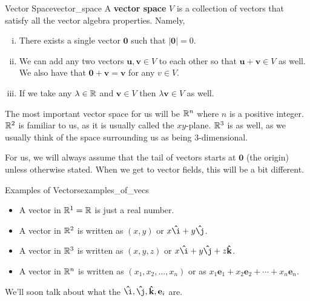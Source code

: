         \begin{df}{Vector Space}{vector_space}
        A \textbf{vector space}  $V$ is a collection of vectors that satisfy all the vector algebra properties. Namely,
        \begin{enumerate}[(i)]
            \item There exists a single vector $\mathbf{0}$ such that $|\mathbf{0}|=0.$
            \item We can add any two vectors $\mathbf{u},\mathbf{v}\in V$ to each other so that $\mathbf{u}+\mathbf{v}\in V$ as well. We also have that $\mathbf{0}+\mathbf{v}=\mathbf{v}$ for any $v\in V$.
            \item If we take any $\lambda \in \mathbb{R}$ and $\mathbf{v}\in V$ then $\lambda \mathbf{v} \in V$ as well.
        \end{enumerate}
        \end{df}
        
        The most important vector space for us will be $\mathbb{R}^n$ where $n$ is a positive integer.  $\mathbb{R}^2$ is familiar to us, as it is usually called the $xy$-plane. $\mathbb{R}^3$ is as well, as we usually think of the space surrounding us as being 3-dimensional.
        
        \begin{remark}
        For us, we will always assume that the tail of vectors starts at $\mathbf{0}$ (the origin) unless otherwise stated.  When we get to vector fields, this will be a bit different.
        \end{remark}
        
        \begin{ex}{Examples of Vectors}{examples_of_vecs}
        \begin{itemize}
            \item A vector in $\mathbb{R}^1=\mathbb{R}$ is just a real number.
            \item A vector in $\mathbb{R}^2$ is written as $(x,y)$ or $x\mathbf{\hat{\i}}+y\mathbf{\hat{\j}}$.
            \item A vector in $\mathbb{R}^3$ is written as $(x,y,z)$ or $x\mathbf{\hat{\i}}+y\mathbf{\hat{\j}}+z\mathbf{\hat{k}}$.
            \item A vector in $\mathbb{R}^n$ is written as $(x_1,x_2,\dots,x_n)$ or as 
            $x_1 \mathbf{e}_1+x_2 \mathbf{e}_2+\cdots+x_n \mathbf{e}_n.$ 
        \end{itemize}
        \end{ex}
        We'll soon talk about what the $\mathbf{\hat{\i}}, \mathbf{\hat{\j}}, \mathbf{\hat{k}}, \mathbf{e}_i$ are.
        
